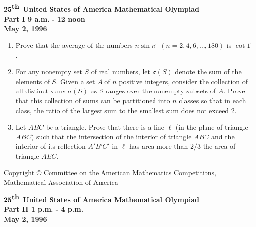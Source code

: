 \documentclass[12pt]{article}
\begin{document}
\setlength{\baselineskip}{.24in}
\begin{center}
${\bf 25}^{\mbox{\bf th}}$ {\bf United States of America
Mathematical Olympiad} \\[.1in]
{\bf Part I \hspace{.25in} 9 a.m. - 12 noon}\\[.05in]
{\bf May 2, 1996}
\end{center}
\begin{enumerate}

\vspace*{.3in}

\item %
Prove that the average of the numbers $n \sin n^{\circ} \; 
(n = 2,4,6,\ldots,180)$ is $\cot 1^{\circ}$.

\item %
For any nonempty set $S$ of real numbers, let $\sigma(S)$ denote
the sum of the elements of $S$. Given a set $A$ of $n$ positive
integers, consider the collection of all distinct sums $\sigma(S)$
as $S$ ranges over the nonempty subsets of $A$.  Prove that this
collection of sums can be partitioned into $n$ classes so that in
each
class, the ratio of the largest sum to the smallest sum does not
exceed 2.

\item %
Let $ABC$ be a triangle.  Prove that there is a line $\ell$ (in
the plane of triangle $ABC$) such that the intersection of the
interior of triangle $ABC$ and the interior of its reflection
$A'B'C'$ in $\ell$ has area more than $2/3$ the area of triangle
$ABC$.

\end{enumerate}
\vspace*{\fill}
\begin{center}
{\footnotesize Copyright \copyright \hspace{.05in} Committee on
the American Mathematics Competitions, \\ 
Mathematical Association of America}
\end{center}

\newpage
\begin{center}
${\bf 25}^{\mbox{\bf th}}$ {\bf United States of America
Mathematical Olympiad} \\[.1in]
{\bf Part II \hspace{.25in} 1 p.m. - 4 p.m.}\\[.05in]
{\bf May 2, 1996}
\end{center}

\vspace*{.3in}
\end{document}
